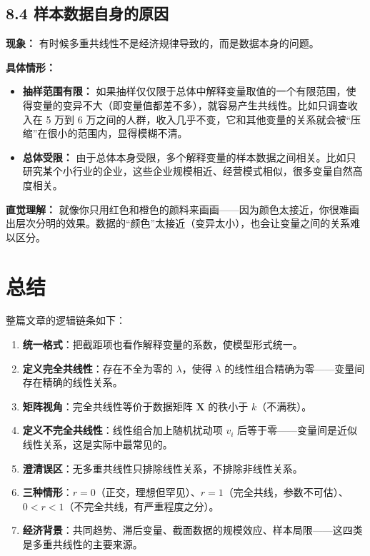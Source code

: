 \documentclass[12pt,a4paper]{ctexart}
\begin{document}
\subsection*{8.4 样本数据自身的原因}

\textbf{现象：} 有时候多重共线性不是经济规律导致的，而是数据本身的问题。

\textbf{具体情形：}

\begin{itemize}
    \item \textbf{抽样范围有限：} 如果抽样仅仅限于总体中解释变量取值的一个有限范围，使得变量的变异不大（即变量值都差不多），就容易产生共线性。比如只调查收入在 5 万到 6 万之间的人群，收入几乎不变，它和其他变量的关系就会被“压缩”在很小的范围内，显得模糊不清。
    \item \textbf{总体受限：} 由于总体本身受限，多个解释变量的样本数据之间相关。比如只研究某个小行业的企业，这些企业规模相近、经营模式相似，很多变量自然高度相关。
\end{itemize}

\textbf{直觉理解：} 就像你只用红色和橙色的颜料来画画——因为颜色太接近，你很难画出层次分明的效果。数据的“颜色”太接近（变异太小），也会让变量之间的关系难以区分。

\section*{总结}

整篇文章的逻辑链条如下：

\begin{enumerate}[leftmargin=2.5em]
    \item \textbf{统一格式}：把截距项也看作解释变量的系数，使模型形式统一。
    \item \textbf{定义完全共线性}：存在不全为零的 $\lambda$，使得 $\lambda$ 的线性组合精确为零——变量间存在精确的线性关系。
    \item \textbf{矩阵视角}：完全共线性等价于数据矩阵 $\boldsymbol{X}$ 的秩小于 $k$（不满秩）。
    \item \textbf{定义不完全共线性}：线性组合加上随机扰动项 $v_i$ 后等于零——变量间是近似线性关系，这是实际中最常见的。
    \item \textbf{澄清误区}：无多重共线性只排除线性关系，不排除非线性关系。
    \item \textbf{三种情形}：$r=0$（正交，理想但罕见）、$r=1$（完全共线，参数不可估）、$0<r<1$（不完全共线，有严重程度之分）。
    \item \textbf{经济背景}：共同趋势、滞后变量、截面数据的规模效应、样本局限——这四类是多重共线性的主要来源。
\end{enumerate}
\end{document}
